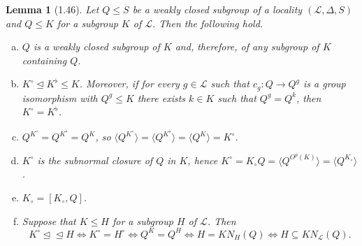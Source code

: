 \documentclass{amsart}
\numberwithin{equation}{section}
\newtheorem{lemma}[equation]{Lemma}
\theoremstyle{definition}
\theoremstyle{subresult}
\theoremstyle{caseresult}
\renewcommand{\L}{\mathcal{L}}
\newcommand{\norm}{\trianglelefteq}
\newcommand{\fto}{\longrightarrow}
\newcommand{\<}{\langle}
\renewcommand{\>}{\rangle}
\begin{document}
\begin{lemma}[1.46]\label{lemma:weakly closed subgroups in localities}
	Let $Q \le S$ be a weakly closed subgroup of a locality $(\L,\Delta,S)$ and $Q \le K$ for a subgroup $K$ of $\L$. Then the following hold.
	\begin{enumerate}[(a)]
		\item $Q$ is a weakly closed subgroup of $K$ and, therefore, of any subgroup of $K$ containing $Q$.
		\item $K^\circ \norm K^\flat \le K$. Moreover, if for every $g \in \L$ such that $c_g : Q \fto Q^g$ is a group isomorphism with $Q^g \le K$ there exists $k \in K$ such that $Q^g=Q^k$, then $K^\circ = K^\flat$.
		\item $Q^{K^\circ} = Q^{K^\flat} = Q^{K}$, so $\langle Q^{K^\circ} \rangle = \langle Q^{K^\flat} \rangle = \langle Q^K \rangle = K^\circ$.
		\item $K^\circ$ is the subnormal closure of $Q$ in $K$, hence $K^\circ = K_\circ Q = \langle Q^{O^p(K)} \rangle = \< Q^{K_\circ} \>$.
		\item $K_\circ = [K_\circ,Q]$. 
		\item Suppose that $K \le H$ for a subgroup $H$ of $\L$. Then
		\[
		K^\circ \norm \norm H \iff K^\circ = H^\circ \iff Q^K =Q^H \iff H=KN_H(Q) \iff H \subseteq KN_\L(Q).
		\]
	\end{enumerate}
\end{lemma}
\end{document}

